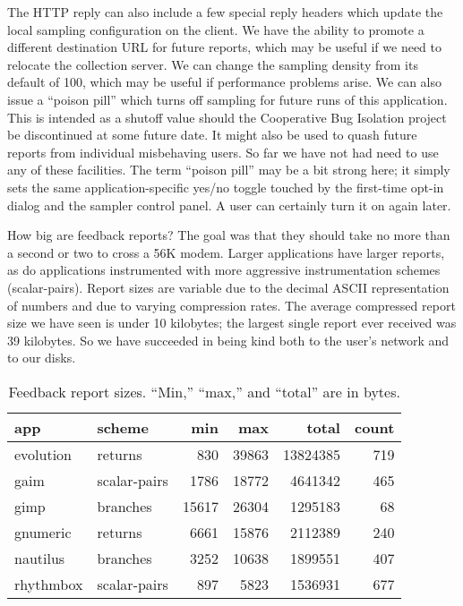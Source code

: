 \documentclass[times,10pt,twocolumn]{article}
\begin{document}
The HTTP reply can also include a few special reply headers which
update the local sampling configuration on the client.  We have the
ability to promote a different destination URL for future reports,
which may be useful if we need to relocate the collection server.  We
can change the sampling density from its default of 100, which may be
useful if performance problems arise.  We can also issue a ``poison
pill'' which turns off sampling for future runs of this application.
This is intended as a shutoff value should the Cooperative Bug
Isolation project be discontinued at some future date.  It might also
be used to quash future reports from individual misbehaving users.  So
far we have not had need to use any of these facilities.  The term
``poison pill'' may be a bit strong here; it simply sets the same
application-specific yes/no toggle touched by the first-time opt-in
dialog and the sampler control panel.  A user can certainly turn it on
again later.

How big are feedback reports?  The goal was that they should take no
more than a second or two to cross a 56K modem.  Larger applications
have larger reports, as do applications instrumented with more
aggressive instrumentation schemes (scalar-pairs).  Report sizes are
variable due to the decimal ASCII representation of numbers and due to
varying compression rates.  The average compressed report size we have
seen is under 10 kilobytes; the largest single report ever received
was 39 kilobytes.  So we have succeeded in being kind both to the
user's network and to our disks.

\begin{table*}
  \centering
  \begin{tabular}{llrrrr}
    app & scheme & min & max & total & count \\ \hline
    evolution & returns & 830 & 39863 & 13824385 & 719 \\
    gaim & scalar-pairs & 1786 & 18772 & 4641342 & 465 \\
    gimp & branches & 15617 & 26304 & 1295183 & 68 \\
    gnumeric & returns & 6661 & 15876 & 2112389 & 240 \\
    nautilus & branches & 3252 & 10638 & 1899551 & 407 \\
    rhythmbox & scalar-pairs & 897 & 5823 & 1536931 & 677
  \end{tabular}
  \caption{Feedback report sizes.  ``Min,'' ``max,'' and ``total'' are
    in bytes.}
  \label{report-sizes}
\end{table*}
\end{document}
